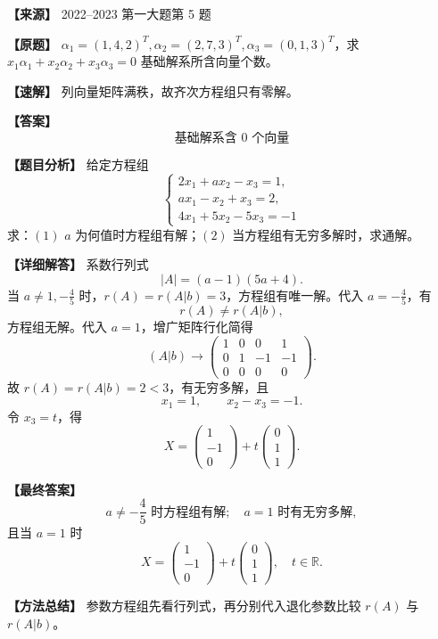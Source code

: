 \documentclass[11pt,a4paper,UTF8]{ctexart}
\begin{document}
\begin{answerbox}
\textbf{【来源】} 2022--2023 第一大题第 5 题

\textbf{【原题】}
$\alpha_1=(1,4,2)^T,\alpha_2=(2,7,3)^T,\alpha_3=(0,1,3)^T$，求 $x_1\alpha_1+x_2\alpha_2+x_3\alpha_3=0$ 基础解系所含向量个数。

\textbf{【速解】}
列向量矩阵满秩，故齐次方程组只有零解。

\textbf{【答案】}
\[\text{基础解系含 }0\text{ 个向量}\]
\end{answerbox}

\begin{answerbox}
\textbf{【题目分析】} 给定方程组
\[
\begin{cases}
2x_1+ax_2-x_3=1,\\
ax_1-x_2+x_3=2,\\
4x_1+5x_2-5x_3=-1
\end{cases}
\]
求：$(1)$ $a$ 为何值时方程组有解；$(2)$ 当方程组有无穷多解时，求通解。

\textbf{【详细解答】} 系数行列式
\[
|A|=(a-1)(5a+4).
\]
当 $a\ne1,-\frac45$ 时，$r(A)=r(A|b)=3$，方程组有唯一解。代入 $a=-\frac45$，有
\[
r(A)\ne r(A|b),
\]
方程组无解。代入 $a=1$，增广矩阵行化简得
\[
(A|b)\to
\begin{pmatrix}
1&0&0&1\\
0&1&-1&-1\\
0&0&0&0
\end{pmatrix}.
\]
故 $r(A)=r(A|b)=2<3$，有无穷多解，且
\[
x_1=1,\qquad x_2-x_3=-1.
\]
令 $x_3=t$，得
\[
X=\begin{pmatrix}1\\-1\\0\end{pmatrix}
+t\begin{pmatrix}0\\1\\1\end{pmatrix}.
\]

\textbf{【最终答案】}
\[
a\ne-\frac45\text{ 时方程组有解};
\quad a=1\text{ 时有无穷多解},
\]
且当 $a=1$ 时
\[
X=\begin{pmatrix}1\\-1\\0\end{pmatrix}
+t\begin{pmatrix}0\\1\\1\end{pmatrix},\quad t\in\mathbb R.
\]

\textbf{【方法总结】} 参数方程组先看行列式，再分别代入退化参数比较 $r(A)$ 与 $r(A|b)$。
\end{answerbox}
\end{document}
